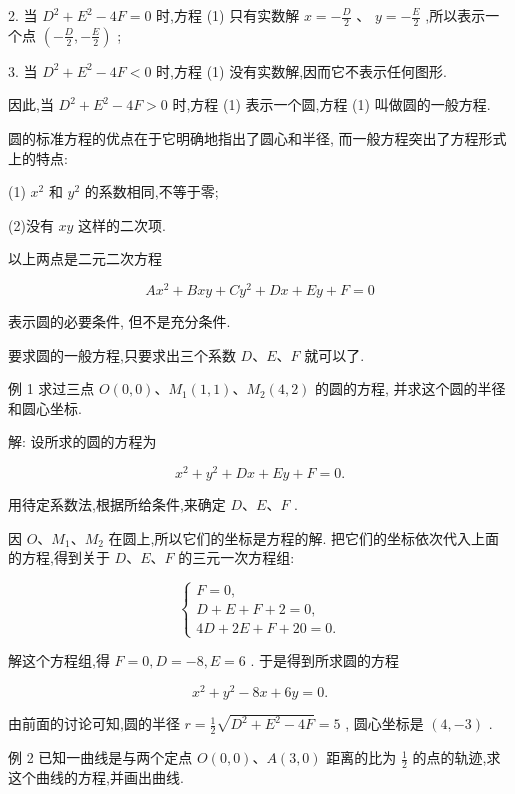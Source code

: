 \documentclass[lang=cn,newtx,10pt,scheme=chinese]{elegantbook}
\begin{document}
2. 当 \({D}^{2} + {E}^{2} - {4F} = 0\) 时,方程 (1) 只有实数解 \(x = - \frac{D}{2}\) 、 \(y = - \frac{E}{2}\) ,所以表示一个点 \(\left( {-\frac{D}{2}, - \frac{E}{2}}\right)\) ;

3. 当 \({D}^{2} + {E}^{2} - {4F} < 0\) 时,方程 (1) 没有实数解,因而它不表示任何图形.

因此,当 \({D}^{2} + {E}^{2} - {4F} > 0\) 时,方程 (1) 表示一个圆,方程 (1) 叫做圆的一般方程.

圆的标准方程的优点在于它明确地指出了圆心和半径, 而一般方程突出了方程形式上的特点:

(1) \({x}^{2}\) 和 \({y}^{2}\) 的系数相同,不等于零;

(2)没有 \({xy}\) 这样的二次项.

以上两点是二元二次方程

\[
  A{x}^{2} + {Bxy} + C{y}^{2} + {Dx} + {Ey} + F = 0
\]

表示圆的必要条件, 但不是充分条件.

要求圆的一般方程,只要求出三个系数 \(D\text{、}E\text{、}F\) 就可以了.

例 1 求过三点 \(O\left( {0,0}\right) \text{、}{M}_{1}\left( {1,1}\right) \text{、}{M}_{2}\left( {4,2}\right)\) 的圆的方程, 并求这个圆的半径和圆心坐标.

解: 设所求的圆的方程为

\[
    {x}^{2} + {y}^{2} + {Dx} + {Ey} + F = 0.
\]

用待定系数法,根据所给条件,来确定 \(D\text{、}E\text{、}F\) .

因 \(O\text{、}{M}_{1}\text{、}{M}_{2}\) 在圆上,所以它们的坐标是方程的解. 把它们的坐标依次代入上面的方程,得到关于 \(D\text{、}E\text{、}F\) 的三元一次方程组:

\[
  \left\{ \begin{array}{l} F = 0, \\ D + E + F + 2 = 0, \\ {4D} + {2E} + F + {20} = 0. \end{array}\right.
\]

解这个方程组,得 \(F = 0,D = - 8,E = 6\) . 于是得到所求圆的方程

\[
    {x}^{2} + {y}^{2} - {8x} + {6y} = 0.
\]

由前面的讨论可知,圆的半径 \(r = \frac{1}{2}\sqrt{{D}^{2} + {E}^{2} - {4F}} = 5\) , 圆心坐标是 \(\left( {4, - 3}\right)\) .

例 2 已知一曲线是与两个定点 \(O\left( {0,0}\right) \text{、}A\left( {3,0}\right)\) 距离的比为 \(\frac{1}{2}\) 的点的轨迹,求这个曲线的方程,并画出曲线.
\end{document}
